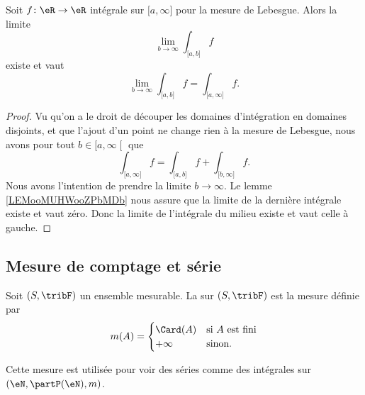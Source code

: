 \begin{lemma}        \label{LEMooKGZDooWiKiHR}
	Soit \( f\colon \eR\to \eR\) intégrale sur \( \mathopen[ a , \infty \mathclose]\) pour la mesure de Lebesgue. Alors la limite
	\begin{equation}
		\lim_{b\to \infty}\int_{\mathopen[ a , b \mathclose]}f
	\end{equation}
	existe et vaut
	\begin{equation}
		\lim_{b\to \infty}\int_{\mathopen[ a , b \mathclose]}f =\int_{\mathopen[ a , \infty \mathclose]}f.
	\end{equation}
\end{lemma}

\begin{proof}
	Vu qu'on a le droit de découper les domaines d'intégration en domaines disjoints, et que l'ajout d'un point ne change rien à la mesure de Lebesgue, nous avons pour tout \( b\in \mathopen[ a , \infty \mathclose[\) que
	\begin{equation}
		\int_{\mathopen[ a , \infty \mathclose]}f=\int_{\mathopen[ a , b \mathclose]}f+\int_{\mathopen[ b , \infty \mathclose]}f.
	\end{equation}
	Nous avons l'intention de prendre la limite \( b\to \infty\).  Le lemme \ref{LEMooMUHWooZPbMDb} nous assure que la limite de la dernière intégrale existe et vaut zéro. Donc la limite de l'intégrale du milieu existe et vaut celle à gauche.
\end{proof}

\subsection{Mesure de comptage et série}

\begin{definition}      \label{DEFooILJRooByDzhs}
	Soit \( (S,\tribF)\) un ensemble mesurable. La  sur \( (S,\tribF)\) est la mesure définie par
	\begin{equation}
		m(A)=\begin{cases}
			\Card(A) & \text{si } A\text{ est fini} \\
			+\infty  & \text{sinon}.
		\end{cases}
	\end{equation}
\end{definition}
Cette mesure est utilisée pour voir des séries comme des intégrales sur \( (\eN,\partP(\eN),m)\).

